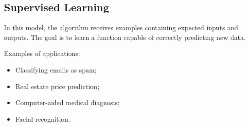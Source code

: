 \subsection{Supervised Learning}

In this model, the algorithm receives examples containing expected inputs and outputs. The goal is
to learn a function capable of correctly predicting new data.

Examples of applications:

\begin{itemize}
    \item Classifying emails as spam;
    \item Real estate price prediction;
    \item Computer-aided medical diagnosis;
    \item Facial recognition.
\end{itemize}
 